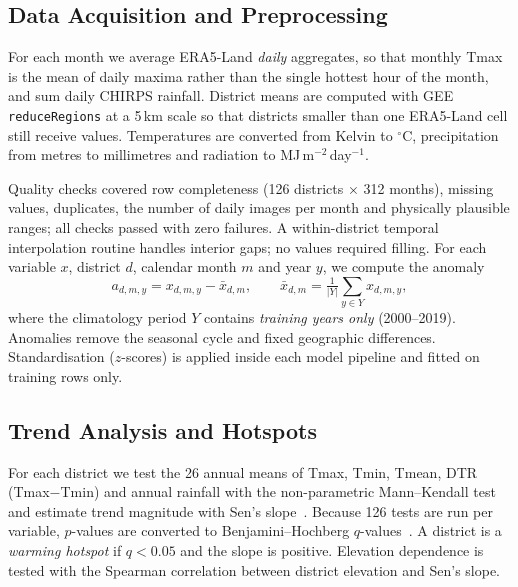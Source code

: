 \documentclass[conference]{IEEEtran}
\newcommand{\degC}{\ensuremath{^\circ}C}
\begin{document}
\subsection{Data Acquisition and Preprocessing}
For each month we average ERA5-Land \emph{daily} aggregates, so that monthly Tmax is the mean of daily maxima rather than the single hottest hour of the month, and sum daily CHIRPS rainfall. District means are computed with GEE \texttt{reduceRegions} at a 5\,km scale so that districts smaller than one ERA5-Land cell still receive values. Temperatures are converted from Kelvin to \degC, precipitation from metres to millimetres and radiation to MJ\,m$^{-2}$\,day$^{-1}$.

Quality checks covered row completeness (126 districts $\times$ 312 months), missing values, duplicates, the number of daily images per month and physically plausible ranges; all checks passed with zero failures. A within-district temporal interpolation routine handles interior gaps; no values required filling. For each variable $x$, district $d$, calendar month $m$ and year $y$, we compute the anomaly
\begin{equation}
a_{d,m,y} = x_{d,m,y} - \bar{x}_{d,m}, \qquad \bar{x}_{d,m} = \tfrac{1}{|Y|}\textstyle\sum_{y\in Y} x_{d,m,y},
\end{equation}
where the climatology period $Y$ contains \emph{training years only} (2000--2019). Anomalies remove the seasonal cycle and fixed geographic differences. Standardisation ($z$-scores) is applied inside each model pipeline and fitted on training rows only.

\subsection{Trend Analysis and Hotspots}
For each district we test the 26 annual means of Tmax, Tmin, Tmean, DTR (Tmax$-$Tmin) and annual rainfall with the non-parametric Mann--Kendall test~\cite{mann1945,kendall1975} and estimate trend magnitude with Sen's slope~\cite{sen1968}. Because 126 tests are run per variable, $p$-values are converted to Benjamini--Hochberg $q$-values~\cite{benjamini1995}. A district is a \emph{warming hotspot} if $q<0.05$ and the slope is positive. Elevation dependence is tested with the Spearman correlation between district elevation and Sen's slope.
\end{document}
